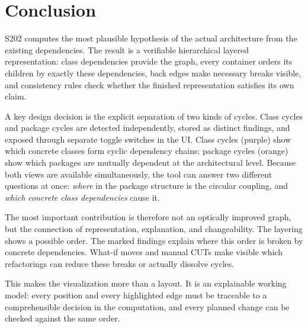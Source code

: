 \documentclass[a4paper,11pt]{article}
\begin{document}
\section{Conclusion}

S202 computes the most plausible hypothesis of the actual architecture from
the existing dependencies. The result is a verifiable hierarchical layered
representation: class dependencies provide the graph, every container orders
its children by exactly these dependencies, back edges make necessary breaks
visible, and consistency rules check whether the finished representation
satisfies its own claim.

A key design decision is the explicit separation of two kinds of cycles.
Class cycles and package cycles are detected independently, stored as distinct
findings, and exposed through separate toggle switches in the UI. Class cycles
(purple) show which concrete classes form cyclic dependency chains;
package cycles (orange) show which packages are mutually dependent at the
architectural level. Because both views are available simultaneously, the tool
can answer two different questions at once: \emph{where} in the package
structure is the circular coupling, and \emph{which concrete class
dependencies} cause it.

The most important contribution is therefore not an optically improved graph,
but the connection of representation, explanation, and changeability. The
layering shows a possible order. The marked findings explain where this order
is broken by concrete dependencies. What-if moves and manual CUTs make visible
which refactorings can reduce these breaks or actually dissolve cycles.

This makes the visualization more than a layout. It is an explainable working
model: every position and every highlighted edge must be traceable to a
comprehensible decision in the computation, and every planned change can be
checked against the same order.
\end{document}
